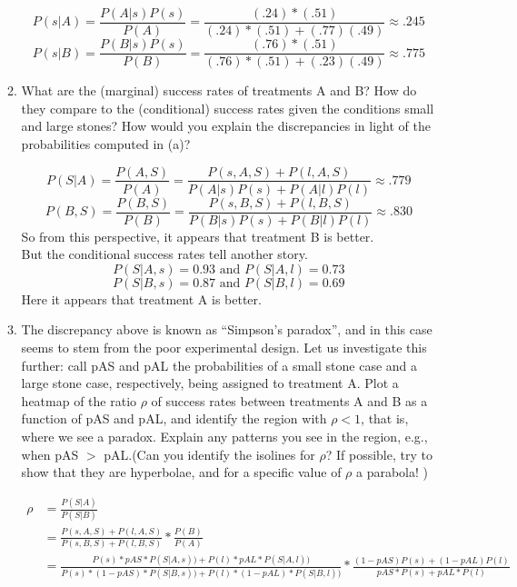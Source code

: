 \documentclass[11pt]{article}
\newcommand{\tand}{\text{ and }}
\theoremstyle{definition}
\theoremstyle{remark}
\theoremstyle{definition}
\begin{document}
\begin{enumerate}
\begin{enumerate}
$$P(s|A) = \frac{P(A|s)P(s)}{P(A)} = \frac{(.24)*(.51)}{(.24)*(.51) + (.77)(.49)} \approx .245$$
$$P(s|B) = \frac{P(B|s)P(s)}{P(B)} = \frac{(.76)*(.51)}{(.76)*(.51) + (.23)(.49)} \approx .775$$



\item What are the (marginal) success rates of treatments A and  B? How do they compare to the (conditional) success rates given the conditions small and large stones? How would you explain the discrepancies in light of the probabilities computed in (a)?

$$P(S|A) = \frac{P(A,S)}{P(A)} = \frac{P(s,A,S) + P(l,A,S)}{P(A|s)P(s) + P(A|l)P(l)} \approx .779$$
$$P(B,S) = \frac{P(B,S)}{P(B)} = \frac{P(s,B,S) + P(l,B,S)}{P(B|s)P(s) + P(B|l)P(l)} \approx .830$$
So from this perspective, it appears that treatment B is better. \\
But the conditional success rates tell another story. 
$$P(S|A,s) = 0.93 \tand P(S|A,l) = 0.73$$
$$P(S|B,s) = 0.87 \tand P(S|B,l) = 0.69$$
Here it appears that treatment A is better. \\

\item The discrepancy above is known as “Simpson’s paradox”, and in this case seems to stem from the poor experimental design. Let us investigate this further: call pAS and pAL the probabilities of a small stone case and a large stone case, respectively, being assigned to treatment A. Plot a heatmap of the ratio $\rho$ of success rates between treatments A and B as a function of pAS and pAL, and identify the region with $\rho < 1$, that is, where we see a paradox. Explain any patterns you see in the region, e.g., when pAS $>$ pAL.(Can you identify the isolines for $\rho$? If possible, try to show that they are hyperbolae, and for a specific value of $\rho$ a parabola! )

\begin{align*}
\rho 
&= \frac{P(S|A)}{P(S|B)} \\
&= \frac{P(s,A,S) + P(l,A,S)}{ P(s,B,S) + P(l,B,S)} * \frac{P(B)}{P(A)} \\
&= \frac{P(s)*pAS*P(S|A,s)) + P(l)*pAL*P(S|A,l))}{P(s)*(1-pAS)*P(S|B,s)) + P(l)*(1-pAL)*P(S|B,l))} * 
	\frac{(1-pAS)P(s) + (1-pAL)P(l)}{pAS*P(s) + pAL*P(l)}
\end{align*}


\end{enumerate}
\end{enumerate}
\end{document}
